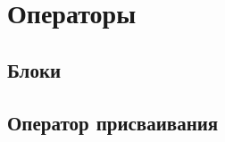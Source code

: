 \hypertarget{statements}{%
\section{Операторы}\label{stmt:chapter}}

\hypertarget{blocks}{%
\subsection{Блоки}\label{stmt:blocks}}

\hypertarget{assignment}{%
\subsection{Оператор присваивания}\label{stmt:assignment}}

